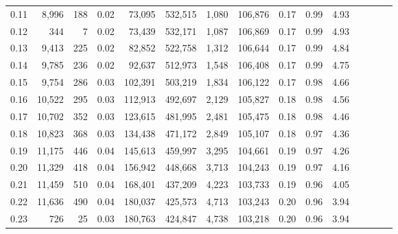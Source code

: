 \begin{tabular}{rrrcrrrrrrrrrrr}
0.11 &   8,996 &    188 &                                       0.02 &   73,095 &  532,515 &    1,080 &  106,876 &  0.17 &  0.99 &                         4.93 \\
0.12 &     344 &      7 &                                       0.02 &   73,439 &  532,171 &    1,087 &  106,869 &  0.17 &  0.99 &                         4.93 \\
0.13 &   9,413 &    225 &                                       0.02 &   82,852 &  522,758 &    1,312 &  106,644 &  0.17 &  0.99 &                         4.84 \\
0.14 &   9,785 &    236 &                                       0.02 &   92,637 &  512,973 &    1,548 &  106,408 &  0.17 &  0.99 &                         4.75 \\
0.15 &   9,754 &    286 &                                       0.03 &  102,391 &  503,219 &    1,834 &  106,122 &  0.17 &  0.98 &                         4.66 \\
0.16 &  10,522 &    295 &                                       0.03 &  112,913 &  492,697 &    2,129 &  105,827 &  0.18 &  0.98 &                         4.56 \\
0.17 &  10,702 &    352 &                                       0.03 &  123,615 &  481,995 &    2,481 &  105,475 &  0.18 &  0.98 &                         4.46 \\
0.18 &  10,823 &    368 &                                       0.03 &  134,438 &  471,172 &    2,849 &  105,107 &  0.18 &  0.97 &                         4.36 \\
0.19 &  11,175 &    446 &                                       0.04 &  145,613 &  459,997 &    3,295 &  104,661 &  0.19 &  0.97 &                         4.26 \\
0.20 &  11,329 &    418 &                                       0.04 &  156,942 &  448,668 &    3,713 &  104,243 &  0.19 &  0.97 &                         4.16 \\
0.21 &  11,459 &    510 &                                       0.04 &  168,401 &  437,209 &    4,223 &  103,733 &  0.19 &  0.96 &                         4.05 \\
0.22 &  11,636 &    490 &                                       0.04 &  180,037 &  425,573 &    4,713 &  103,243 &  0.20 &  0.96 &                         3.94 \\
0.23 &     726 &     25 &                                       0.03 &  180,763 &  424,847 &    4,738 &  103,218 &  0.20 &  0.96 &                         3.94 \\

\end{tabular}
